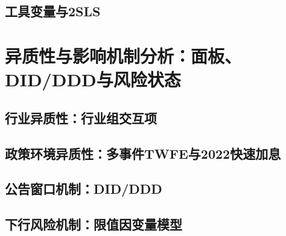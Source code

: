 \documentclass[UTF8,zihao=-4]{ctexart}
\begin{document}

\subsection{工具变量与2SLS}


\section{异质性与影响机制分析：面板、DID/DDD与风险状态}

\subsection{行业异质性：行业组交互项}


\subsection{政策环境异质性：多事件TWFE与2022快速加息}


\subsection{公告窗口机制：DID/DDD}


\subsection{下行风险机制：限值因变量模型}

\end{document}
